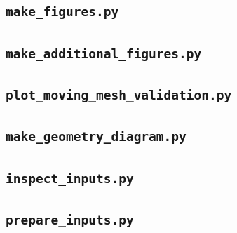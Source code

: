 
\label{app:source11end}

\subsection{\texorpdfstring{\texttt{make\_figures.py}}{make\_figures.py}}
\label{app:source12}


\label{app:source12end}

\subsection{\texorpdfstring{\texttt{make\_additional\_figures.py}}{make\_additional\_figures.py}}
\label{app:source13}


\label{app:source13end}

\subsection{\texorpdfstring{\texttt{plot\_moving\_mesh\_validation.py}}{plot\_moving\_mesh\_validation.py}}
\label{app:source14}


\label{app:source14end}

\subsection{\texorpdfstring{\texttt{make\_geometry\_diagram.py}}{make\_geometry\_diagram.py}}
\label{app:source15}


\label{app:source15end}

\subsection{\texorpdfstring{\texttt{inspect\_inputs.py}}{inspect\_inputs.py}}
\label{app:source16}


\label{app:source16end}

\subsection{\texorpdfstring{\texttt{prepare\_inputs.py}}{prepare\_inputs.py}}
\label{app:source17}

